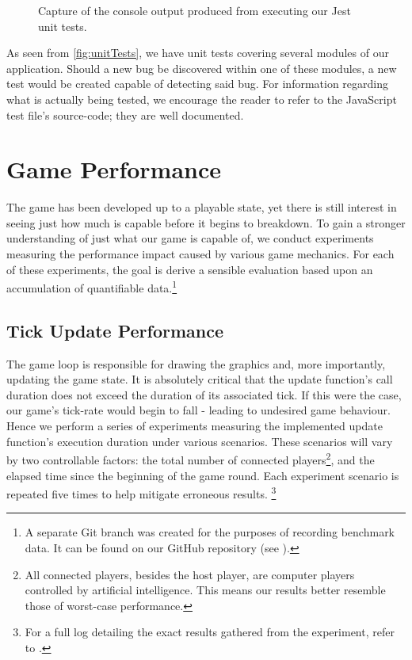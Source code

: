 \documentclass{standalone}
\begin{document}
		\begin{figure}[!htbp]
			\begin{formal}
				
			\end{formal}
			\caption{Capture of the console output produced from executing our Jest unit tests.} \label{fig:unitTests}
		\end{figure}

		As seen from \autoref{fig:unitTests}, we have unit tests covering several modules of our application. Should a new bug be discovered within one of these modules, a new test would be created capable of detecting said bug. For information regarding what is actually being tested, we encourage the reader to refer to the JavaScript test file's source-code; they are well documented.

	\section{Game Performance}
		The game has been developed up to a playable state, yet there is still interest in seeing just how much is capable before it begins to breakdown. To gain a stronger understanding of just what our game is capable of, we conduct experiments measuring the performance impact caused by various game mechanics. For each of these experiments, the goal is derive a sensible evaluation based upon an accumulation of quantifiable data.\footnote{A separate Git branch was created for the purposes of recording benchmark data. It can be found on our GitHub repository (see ).}

		\subsection{Tick Update Performance} \label{sec:tickUpdatePerformance}
			The game loop is responsible for drawing the graphics and, more importantly, updating the game state. It is absolutely critical that the update function's call duration does not exceed the duration of its associated tick. If this were the case, our game's tick-rate would begin to fall - leading to undesired game behaviour. Hence we perform a series of experiments measuring the implemented update function's execution duration under various scenarios. These scenarios will vary by two controllable factors: the total number of connected players\footnote{All connected players, besides the host player, are computer players controlled by artificial intelligence. This means our results better resemble those of worst-case performance.}, and the elapsed time since the beginning of the game round. Each experiment scenario is repeated five times to help mitigate erroneous results. \footnote{For a full log detailing the exact results gathered from the experiment, refer to .}
\end{document}
